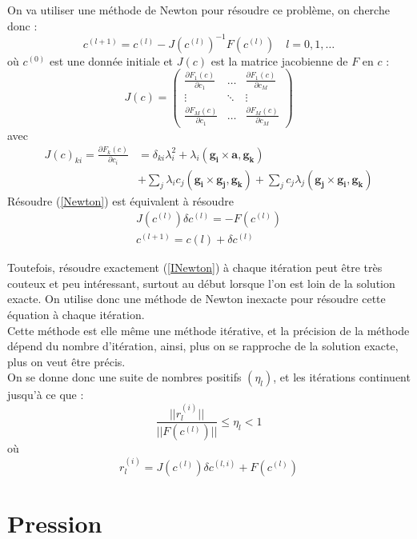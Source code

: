 On va utiliser une méthode de Newton pour résoudre ce problème, on cherche donc :
\begin{equation}
\label{Newton}
c^{(l+1)} = c^{(l)} - J(c^{(l)})^{-1}F(c^{(l)})\quad l=0,1,\ldots
\end{equation}
où $c^{(0)}$ est une donnée initiale et $J(c)$ est la matrice jacobienne de $F$ en $c$ :
\[
J(c)=
\begin{pmatrix}
\frac{\partial F_1(c)}{\partial c_1} & \ldots & \frac{\partial F_1(c)}{\partial c_M}\\
\vdots & \ddots & \vdots\\
\frac{\partial F_M(c)}{\partial c_1} & \ldots & \frac{\partial F_M(c)}{\partial c_M}
\end{pmatrix}
\]
avec 
\begin{align*}
J(c)_{ki} = \frac{\partial F_k(c)}{\partial c_i} &= \delta_{ki}\lambda_i^2 + \lambda_i(\mathbf{g_i}\times \mathbf{a},\mathbf{g_k})\\
&+ \sum_j\lambda_i c_j (\mathbf{g_i}\times\mathbf{g_j},\mathbf{g_k}) + \sum_j c_j\lambda_j (\mathbf{g_j}\times\mathbf{g_i},\mathbf{g_k})
\end{align*}
Résoudre (\ref{Newton}) est équivalent à résoudre 
\begin{equation}
\label{INewton}
\begin{aligned}
J(c^{(l)})\delta c^{(l)} = -F(c^{(l)})\\
c^{(l+1)}=c{(l)}+\delta c^{(l)}
\end{aligned}
\end{equation}

Toutefois, résoudre exactement (\ref{INewton}) à chaque itération peut être très couteux et peu intéressant, surtout au début lorsque l'on est loin de la solution exacte. On utilise donc une méthode de Newton inexacte pour résoudre cette équation à chaque itération.\\
Cette méthode est elle même une méthode itérative, et la précision de la méthode dépend du nombre d'itération, ainsi, plus on se rapproche de la solution exacte, plus on veut être précis.
\\On se donne donc une suite de nombres positifs $(\eta_l)$, et les itérations continuent jusqu'à ce que :
\[
\frac{||r_l^{(i)}||}{||F(c^{(l)})||} \leq \eta_l<1
\]
où
\[
r_l^{(i)} = J(c^{(l)})\delta c^{(l,i)} + F(c^{(l)})
\]

\section{Pression}


